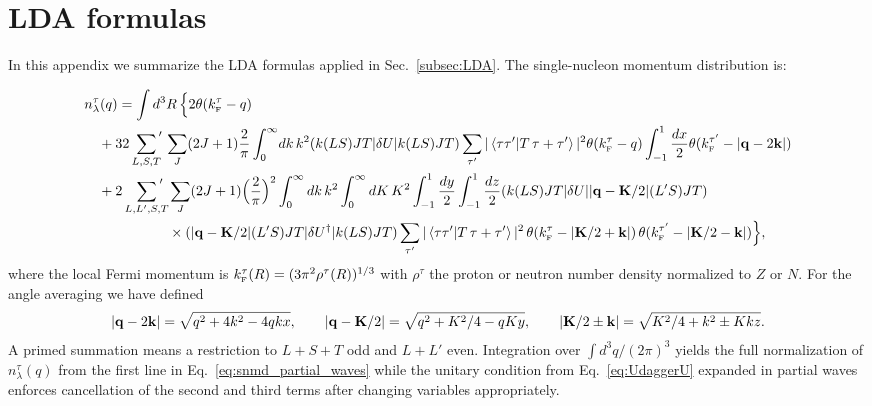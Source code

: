\documentclass[10pt,aps,prc,floatfix,twocolumn,nofootinbib]{revtex4-1}
\begin{document}
\newpage

\appendix

\section{LDA formulas} \label{sec:formulas}


In this appendix we summarize the LDA formulas applied in Sec.~\ref{subsec:LDA}.
The single-nucleon momentum distribution is:
%
\begin{widetext}
\begin{align}
    \label{eq:snmd_partial_waves}
    & n_{\lambda}^{\tau}(q) =  \int d^3R\, \Bigl\{ 2 \theta(\kF^{\tau}-q) \notag \\
    & \quad \null + 32  \sum_{L,S,T}\!\!{\vphantom{\sum}}'\, \sum_{J}  (2J+1)
    \frac{2}{\pi}\int_0^{\infty}\! dk\, k^2  
    \melr{k (L S) J T}{\delta U}{k (L S) J T}  
        \sum_{\tau'} |\braket{\tau \tau'}{T \, \tau+\tau'}|^2
\theta(\kF^{\tau}-q) \int_{-1}^1 \frac{dx}{2}\theta(\kF^{\tau'}-\abs{\mathbf{q}-2\mathbf{k}}) \notag \\
    & \quad \null + 2  \sum_{L,L',S,T}\!\!\!\!\!{\vphantom{\sum}}'\,\,  \sum_{J}  (2J+1)  
    \Bigl(\frac{2}{\pi}\Bigr)^2 \int_0^{\infty} dk\, k^2 \int_0^{\infty} dK\, K^2 \int_{-1}^1 \frac{dy}{2} \int_{-1}^1 \frac{dz}{2}  
    \melr{k (L S) J T}{\delta U}{\abs{\mathbf{q}-\mathbf{K}/2}  (L' S) J T} 
    \notag \\
    & \qquad\qquad\qquad \null\times   
     \melr{\abs{\mathbf{q}-\mathbf{K}/2} (L' S) J T}{\delta U^{\dagger}}{k (L S) J T}  
    \sum_{\tau'} |\braket{\tau \tau'}{T \,\tau+\tau'}|^2
     \,\theta(\kF^{\tau}-\abs{\mathbf{K}/2 + \mathbf{k}}) \,\theta(\kF^{\tau'}-\abs{\mathbf{K}/2 - \mathbf{k}})
     \Bigr\},
 \end{align}
%
where the local Fermi momentum is $k_{\scriptscriptstyle{\text F}}^\tau(R) = (3\pi^2\rho^\tau(R))^{1/3}$ with $\rho^\tau$ the proton or neutron number density normalized to $Z$ or $N$.
For the angle averaging we have defined 
\begin{align}
  \abs{\mathbf{q}-2\mathbf{k}} = \sqrt{q^2+4k^2-4qkx}, 
  \qquad \abs{\mathbf{q}-\mathbf{K}/2} = \sqrt{q^2+K^2/4-qKy}, 
  \qquad
 \abs{\mathbf{K}/2 \pm \mathbf{k}} = \sqrt{K^2/4 + k^2 \pm Kkz}.
\end{align}
%
A primed summation means a restriction to $L + S + T$ odd and $L+L'$ even.
Integration over $\int d^3q/(2\pi)^3$ yields the full normalization of $n_{\lambda}^{\tau}(q)$ from the first line in Eq.~\eqref{eq:snmd_partial_waves} while the unitary condition from Eq.~\eqref{eq:UdaggerU} expanded in partial waves enforces cancellation of the second and third terms after changing variables appropriately.



\end{widetext}
\end{document}
